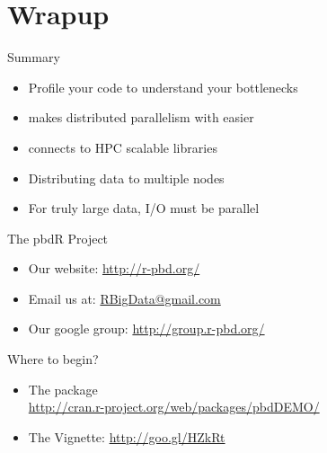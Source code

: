 \section{Wrapup}
\makesubcontentsslides
\hidenum

\begin{frame}
  \begin{block}{Summary}
    \begin{itemize}
      \item Profile your code to understand your bottlenecks
      \item \pbdR makes distributed parallelism with \R easier
      \item \pbdR connects \R to HPC scalable libraries
      \item Distributing data to multiple nodes 
      \item For truly large data, I/O must be parallel
    \end{itemize}
  \end{block}
\end{frame}


\begin{frame}[noframenumbering]
  \begin{block}{The pbdR Project}
    \begin{itemize}
      \item Our website: \url{http://r-pbd.org/}
      \item Email us at: \url{RBigData@gmail.com}
      \item Our google group: \url{http://group.r-pbd.org/}
     \end{itemize}
\end{block}
  \begin{block}{Where to begin?}
    \begin{itemize}
      \item The  package\\
      \url{http://cran.r-project.org/web/packages/pbdDEMO/}\\
      \item The  Vignette: \url{http://goo.gl/HZkRt}
    \end{itemize}
\end{block}
\end{frame}


\section*{}



